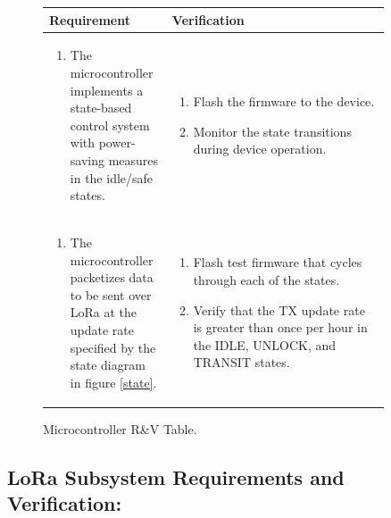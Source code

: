 \documentclass{article}
\begin{document}
\begin{figure}[H]
	\begin{center}
		\begin{tabular}{|p{0.3 \linewidth}|p{0.6 \linewidth}|}
			\hline
			Requirement & Verification  \\
			\hline
			\begin{enumerate}
				\item  The microcontroller implements a state-based control system with power-saving measures in the idle/safe states.  
			\end{enumerate} &
			\begin{enumerate}
				\item Flash the firmware to the device. 
				\item Monitor the state transitions during device operation. 
			\end{enumerate}  \\
			\hline
			\begin{enumerate}
				\item The microcontroller packetizes data to be sent over LoRa at the update rate specified by the state diagram in figure \ref{state}.
			\end{enumerate} & \begin{enumerate}
				\item Flash test firmware that cycles through each of the states. 
				\item Verify that the TX update rate is greater than once per hour in the IDLE, UNLOCK, and TRANSIT states. 
			\end{enumerate} \\
			\hline 
		\end{tabular}
	\end{center}
	\caption{Microcontroller R\&V Table.}
\end{figure}


\subsection{LoRa Subsystem Requirements and Verification:}
\end{document}
